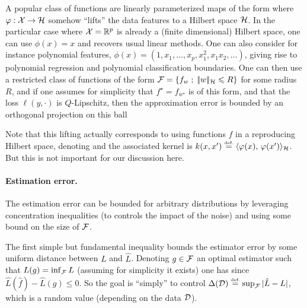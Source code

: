 \begin{exmp}
A popular class of functions are linearly parameterized maps of the form 
where $\varphi : \mathcal{X} \rightarrow \mathcal{H}$ somehow ``lifts'' the data features to a Hilbert space $\mathcal{H}$. In the particular case where $\mathcal{X}=\mathbb{R}^p$ is already a (finite dimensional) Hilbert space, one can use $\phi(x)=x$ and recovers  usual linear methods. One can also consider for instance polynomial features, $\phi(x)=(1, x_1,\ldots,x_p,x_1^2,x_1 x_2, \ldots)$, giving rise to polynomial regression and polynomial classification boundaries.
%
One can then use a restricted class of functions of the form $\mathcal{F} = \left\{ f_w \;;\; |\!| w |\!|_{\mathcal{H}} \leqslant R \right\}$ for some radius $R$, and if one assumes for simplicity that $f^\star=f_{w^\star}$ is of this form, and that the loss $\ell(y,\cdot)$ is $Q$-Lipschitz, then the approximation error is bounded by an orthogonal projection on this ball
\end{exmp}

\begin{rem}
Note that this lifting actually corresponds to using functions $f$ in a reproducing Hilbert space, denoting
and the associated kernel is $k(x,x') \stackrel{\mbox{\upshape\tiny def.}}{=} \langle \varphi(x),\,\varphi(x')\rangle_{\mathcal{H}}$. But this is not important for our discussion here.
\end{rem}


\paragraph{Estimation error.}

The estimation error can be bounded for arbitrary distributions by leveraging concentration inequalities (to controls the impact of the noise) and using some bound on the size of $\mathcal{F}$. 

The first simple but fundamental inequality bounds the estimator error by some uniform distance between $L$ and $\hat L$. Denoting $g \in \mathcal{F}$ an optimal estimator  such that $L(g)=\inf_{\mathcal{F}} L$ (assuming for simplicity it exists) one has
since $\hat L(\hat f) - \hat L(g) \leq 0$.
%
So the goal is ``simply'' to control $\Delta(\mathcal{D}) \stackrel{\mbox{\upshape\tiny def.}}{=} \sup_{\mathcal{F}}|\hat L - L|$, which is a random value (depending on the data $\mathcal{D}$). 



